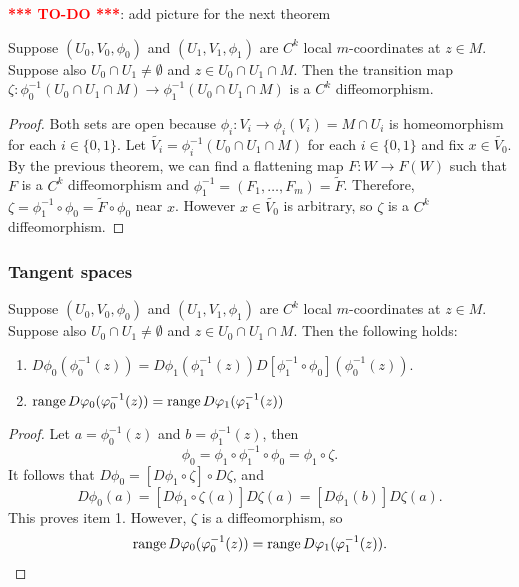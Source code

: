 \documentclass[a4paper]{article}
\newcommand{\TODO}{\textcolor{red}{\textbf{*** TO-DO ***}}}
\begin{document}
\TODO: add picture for the next theorem

\begin{thm}
Suppose $(U_0, V_0, \phi_0)$ and $(U_1, V_1, \phi_1)$
are $C^k$ local $m$-coordinates at $z \in M$. Suppose
also $U_0 \cap U_1 \neq \emptyset$ and $z \in U_0 \cap
U_1 \cap M$. Then the transition map
$\zeta : \phi_0^{-1}(U_0 \cap U_1 \cap M)
\to \phi_1^{-1} (U_0 \cap U_1 \cap M)$ is a $C^k$
diffeomorphism.
\end{thm}

\begin{proof}
Both sets are open because $\phi_i : V_i \to \phi_i(V_i)
= M \cap U_i$ is homeomorphism for each $i \in \{0, 1\}$.
Let $\tilde{V_i} = \phi_i^{-1} (U_0 \cap U_1 \cap M)$
for each $i \in \{0, 1\}$
and fix $x \in \tilde{V_0}$. By the previous theorem, we
can find a flattening map $F : W \to F(W)$ such that
$F$ is a $C^k$ diffeomorphism and $\phi_1^{-1} = (F_1,
\dots, F_m) = \tilde{F}$.
Therefore, $\zeta = \phi_1^{-1} \circ \phi_0
= \tilde{F} \circ \phi_0$
near $x$. However $x \in \tilde{V_0}$ is arbitrary,
so $\zeta$ is a $C^k$ diffeomorphism.
\end{proof}

\subsubsection{Tangent spaces}

\begin{lemma}
Suppose $(U_0, V_0, \phi_0)$ and $(U_1, V_1, \phi_1)$
are $C^k$ local $m$-coordinates at $z \in M$. Suppose
also $U_0 \cap U_1 \neq \emptyset$ and $z \in U_0 \cap
U_1 \cap M$. Then
the following holds:
\begin{enumerate}
\item $D \phi_0 (\phi_0^{-1}(z)) = D\phi_1 (\phi_1^{-1}(z))
D[\phi_1^{-1} \circ \phi_0] (\phi_0^{-1}(z))$.

\item $\operatorname{range} D \varphi_0 (\varphi_0^{-1}(z)) = \operatorname{range} D\varphi_1
(\varphi_1^{-1}(z))$
\end{enumerate}
\end{lemma}

\begin{proof}
Let $a = \phi_0^{-1}(z)$ and $b = \phi_1^{-1}(z)$, then
\[
\phi_0 = \phi_1 \circ \phi^{-1}_1 \circ \phi_0 = \phi_1 \circ
\zeta.
\]
It follows that $D \phi_0 = [D \phi_1 \circ \zeta] \circ D \zeta$,
and
\[
D \phi_0(a) = [D \phi_1 \circ \zeta(a)] D \zeta(a)
= [D \phi_1 (b)] D \zeta(a).
\]
This proves item 1. However, $\zeta$ is a
diffeomorphism, so
\[
\operatorname{range} D\varphi_0(\varphi_0^{-1} (z)) = \operatorname{range} D\varphi_1 (\varphi_1^{-1}(z)).
\]
\end{proof}
\end{document}
